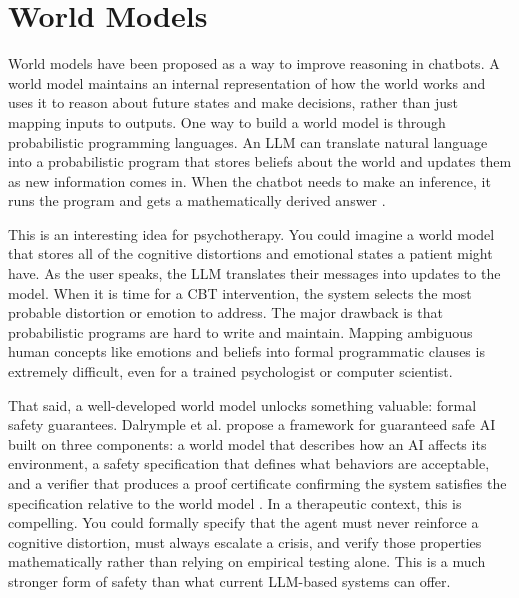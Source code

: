 \documentclass[twoside]{report}
\begin{document}
\section{World Models}
World models have been proposed as a way to improve reasoning in chatbots. A world model maintains an internal representation of how the world works and uses it to reason about future states and make decisions, rather than just mapping inputs to outputs. One way to build a world model is through probabilistic programming languages. An LLM can translate natural language into a probabilistic program that stores beliefs about the world and updates them as new information comes in. When the chatbot needs to make an inference, it runs the program and gets a mathematically derived answer \cite{wong2023word}.

This is an interesting idea for psychotherapy. You could imagine a world model that stores all of the cognitive distortions and emotional states a patient might have. As the user speaks, the LLM translates their messages into updates to the model. When it is time for a CBT intervention, the system selects the most probable distortion or emotion to address. The major drawback is that probabilistic programs are hard to write and maintain. Mapping ambiguous human concepts like emotions and beliefs into formal programmatic clauses is extremely difficult, even for a trained psychologist or computer scientist.

That said, a well-developed world model unlocks something valuable: formal safety guarantees. Dalrymple et al. propose a framework for guaranteed safe AI built on three components: a world model that describes how an AI affects its environment, a safety specification that defines what behaviors are acceptable, and a verifier that produces a proof certificate confirming the system satisfies the specification relative to the world model \cite{dalrymple2024guaranteed}. In a therapeutic context, this is compelling. You could formally specify that the agent must never reinforce a cognitive distortion, must always escalate a crisis, and verify those properties mathematically rather than relying on empirical testing alone. This is a much stronger form of safety than what current LLM-based systems can offer.
\end{document}
